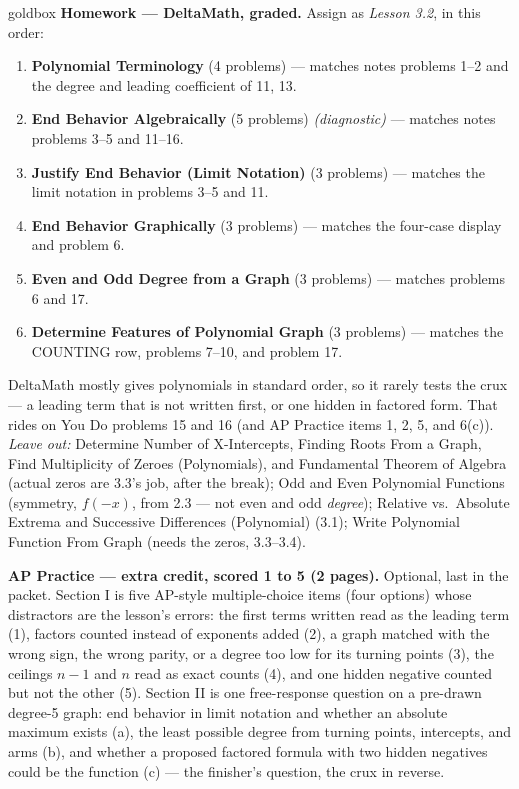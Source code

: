 \documentclass[10pt]{article}
\begin{document}
\begin{skillbox}{goldbox}
\textbf{Homework --- DeltaMath, graded.} Assign as \textit{Lesson 3.2}, in this order:
\begin{enumerate}[itemsep=1pt,topsep=2pt]
  \item \textbf{Polynomial Terminology} (4 problems) --- matches notes problems 1--2 and the
        degree and leading coefficient of 11, 13.
  \item \textbf{End Behavior Algebraically} (5 problems) \textit{(diagnostic)} --- matches
        notes problems 3--5 and 11--16.
  \item \textbf{Justify End Behavior (Limit Notation)} (3 problems) --- matches the limit
        notation in problems 3--5 and 11.
  \item \textbf{End Behavior Graphically} (3 problems) --- matches the four-case display and
        problem 6.
  \item \textbf{Even and Odd Degree from a Graph} (3 problems) --- matches problems 6 and 17.
  \item \textbf{Determine Features of Polynomial Graph} (3 problems) --- matches the
        COUNTING row, problems 7--10, and problem 17.
\end{enumerate}
DeltaMath mostly gives polynomials in standard order, so it rarely tests the crux --- a
leading term that is not written first, or one hidden in factored form. That rides on You Do
problems 15 and 16 (and AP Practice items 1, 2, 5, and 6(c)).
\textit{Leave out:} Determine Number of X-Intercepts, Finding Roots From a Graph, Find
Multiplicity of Zeroes (Polynomials), and Fundamental Theorem of Algebra (actual zeros are
3.3's job, after the break); Odd and Even Polynomial Functions (symmetry, $f(-x)$, from 2.3
--- not even and odd \emph{degree}); Relative vs.\ Absolute Extrema and Successive Differences
(Polynomial) (3.1); Write Polynomial Function From Graph (needs the zeros, 3.3--3.4).

\textbf{AP Practice --- extra credit, scored 1 to 5 (2 pages).} Optional, last in the packet.
Section I is five AP-style multiple-choice items (four options) whose distractors are the
lesson's errors: the first terms written read as the leading term (1), factors counted instead
of exponents added (2), a graph matched with the wrong sign, the wrong parity, or a degree too
low for its turning points (3), the ceilings $n - 1$ and $n$ read as exact counts (4), and one
hidden negative counted but not the other (5). Section II is one free-response question on a
pre-drawn degree-5 graph: end behavior in limit notation and whether an absolute maximum exists
(a), the least possible degree from turning points, intercepts, and arms (b), and whether a
proposed factored formula with two hidden negatives could be the function (c) --- the
finisher's question, the crux in reverse.


\end{skillbox}
\end{document}
